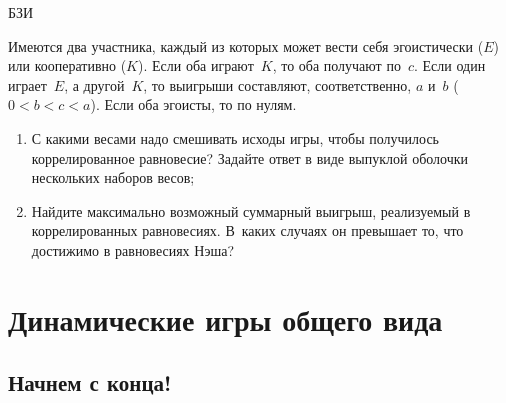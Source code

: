 \begin{problem}\begin{source}
БЗИ
\end{source}
 Имеются
два участника, каждый из которых может вести себя
эгоистически ($E$) или кооперативно ($K$). Если оба
играют~$K$, то оба получают по~$c$. Если один играет~$E$, а
другой~$K$, то выигрыши составляют, соответственно, $a$
и~$b$ (${0<b<c<a}$). Если оба эгоисты, то по нулям.

\begin{enumerate}

\item С какими весами надо смешивать исходы игры, чтобы
получилось коррелированное равновесие? Задайте ответ в виде
выпуклой оболочки нескольких наборов весов;

\item Найдите максимально возможный суммарный выигрыш,
реализуемый в коррелированных равновесиях. В~каких случаях
он превышает то, что достижимо в равновесиях Нэша?

\end{enumerate}






\begin{sol}

\end{sol}
\end{problem}









\section{Динамические игры общего вида}

\subsection{Начнем с конца!}








